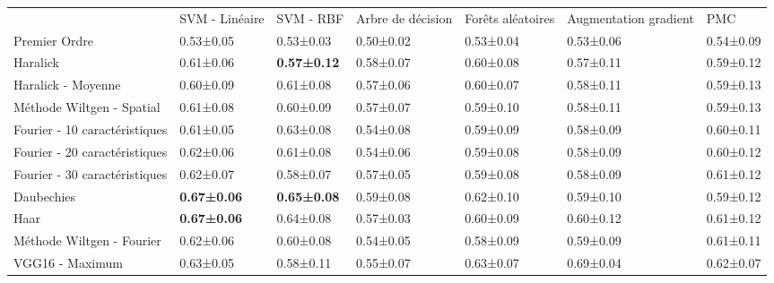 \begin{landscape}
\begin{table}[]
\begin{tabular}{lllllll}
                              & SVM - Linéaire     & SVM - RBF          & Arbre de décision & Forêts aléatoires & Augmentation gradient & PMC       \\
Premier Ordre                 & 0.53±0.05          & 0.53±0.03          & 0.50±0.02         & 0.53±0.04         & 0.53±0.06             & 0.54±0.09 \\
\rowcolor[HTML]{E7E6E6} 
Haralick                      & 0.61±0.06          & \textbf{0.57±0.12} & 0.58±0.07         & 0.60±0.08         & 0.57±0.11             & 0.59±0.12 \\
Haralick - Moyenne            & 0.60±0.09          & 0.61±0.08          & 0.57±0.06         & 0.60±0.07         & 0.58±0.11             & 0.59±0.13 \\
Méthode Wiltgen - Spatial     & 0.61±0.08          & 0.60±0.09          & 0.57±0.07         & 0.59±0.10         & 0.58±0.11             & 0.59±0.13 \\
Fourier - 10 caractéristiques & 0.61±0.05          & 0.63±0.08          & 0.54±0.08         & 0.59±0.09         & 0.58±0.09             & 0.60±0.11 \\
Fourier - 20 caractéristiques & 0.62±0.06          & 0.61±0.08          & 0.54±0.06         & 0.59±0.08         & 0.58±0.09             & 0.60±0.12 \\
Fourier - 30 caractéristiques & 0.62±0.07          & 0.58±0.07          & 0.57±0.05         & 0.59±0.08         & 0.58±0.09             & 0.61±0.12 \\
\rowcolor[HTML]{E7E6E6} 
Daubechies     & \textbf{0.67±0.06} & \textbf{0.65±0.08} & 0.59±0.08         & 0.62±0.10         & 0.59±0.10             & 0.59±0.12 \\
Haar                    & \textbf{0.67±0.06} & 0.64±0.08          & 0.57±0.03         & 0.60±0.09         & 0.60±0.12             & 0.61±0.12 \\
Méthode Wiltgen - Fourier                          & 0.62±0.06          & 0.60±0.08          & 0.54±0.05         & 0.58±0.09         & 0.59±0.09             & 0.61±0.11 \\
VGG16    - Maximum            & 0.63±0.05          & 0.58±0.11          & 0.55±0.07         & 0.63±0.07         & 0.69±0.04             & 0.62±0.07 \\

\end{tabular}
\end{table}
\end{landscape}
